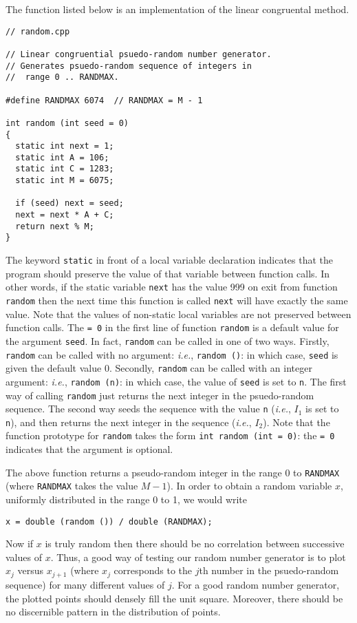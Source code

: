 The function listed below is an implementation of the linear congruental method.
{\small\begin{verbatim}
// random.cpp

// Linear congruential psuedo-random number generator.
// Generates psuedo-random sequence of integers in
//  range 0 .. RANDMAX. 

#define RANDMAX 6074  // RANDMAX = M - 1

int random (int seed = 0)
{
  static int next = 1;
  static int A = 106;
  static int C = 1283;
  static int M = 6075;

  if (seed) next = seed;
  next = next * A + C;
  return next % M;
}
\end{verbatim}}
The keyword {\tt static} in front of a local variable declaration indicates that the 
program should preserve the value of
that variable between function calls. In other words, if the static variable {\tt next}
has the value 999 on exit from function {\tt random} then the next time this function is
called {\tt next} will have exactly the same value. Note that the values of non-static
local variables are not preserved between function calls. The {\tt = 0} in the first line
of function {\tt random} is a default value for the argument {\tt seed}. In fact, {\tt random}
can be called in one of two ways. Firstly, {\tt random} can be called with no argument: {\em i.e.},
{\tt random ()}: in which case, {\tt seed} is given the default value 0. Secondly, {\tt random}
can be called with an integer argument: {\em i.e.},
{\tt random (n)}: in which case, the value of {\tt seed} is set to {\tt n}. The first way of calling
{\tt random} just returns the next integer in the psuedo-random sequence. The
second way seeds the sequence with the value {\tt n} ({\em i.e.}, $I_1$ is set to {\tt n}), and
then returns the next integer in the sequence ({\em i.e.}, $I_2$). Note that the function prototype for
{\tt random} takes the form {\tt int random (int = 0)}: the {\tt = 0} indicates
that the argument is optional.


The above function returns a pseudo-random integer in the range $0$ to {\tt RANDMAX} (where {\tt RANDMAX}
takes the value $M-1$). In order to obtain a random variable $x$, uniformly distributed in the
range 0 to 1, we would write
\begin{verbatim}
x = double (random ()) / double (RANDMAX);
\end{verbatim}
Now if $x$ is truly random then there should be no correlation between successive values of $x$. Thus,
a good way of testing our random number generator is to plot $x_j$ versus $x_{j+1}$ (where $x_j$ corresponds to
the $j$th number in the psuedo-random sequence) for many different values of $j$. For a good random number generator,
the plotted points should densely fill the unit square. Moreover, there should be no discernible pattern in the 
distribution of points.

